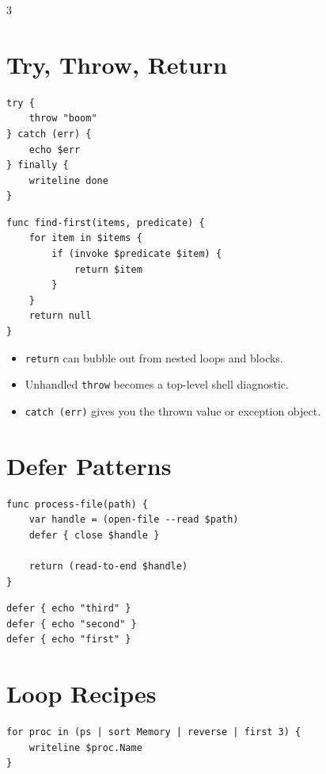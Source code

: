 \begin{multicols*}{3}
\columnbreak

\section{Try, Throw, Return}
\begin{lstlisting}
try {
    throw "boom"
} catch (err) {
    echo $err
} finally {
    writeline done
}
\end{lstlisting}

\begin{lstlisting}
func find-first(items, predicate) {
    for item in $items {
        if (invoke $predicate $item) {
            return $item
        }
    }
    return null
}
\end{lstlisting}

\begin{itemize}
\item \texttt{return} can bubble out from nested loops and blocks.
\item Unhandled \texttt{throw} becomes a top-level shell diagnostic.
\item \texttt{catch (err)} gives you the thrown value or exception object.
\end{itemize}

\section{Defer Patterns}
\begin{lstlisting}
func process-file(path) {
    var handle = (open-file --read $path)
    defer { close $handle }

    return (read-to-end $handle)
}
\end{lstlisting}

\begin{lstlisting}
defer { echo "third" }
defer { echo "second" }
defer { echo "first" }
\end{lstlisting}


\section{Loop Recipes}
\begin{lstlisting}
for proc in (ps | sort Memory | reverse | first 3) {
    writeline $proc.Name
}
\end{lstlisting}


\end{multicols*}
